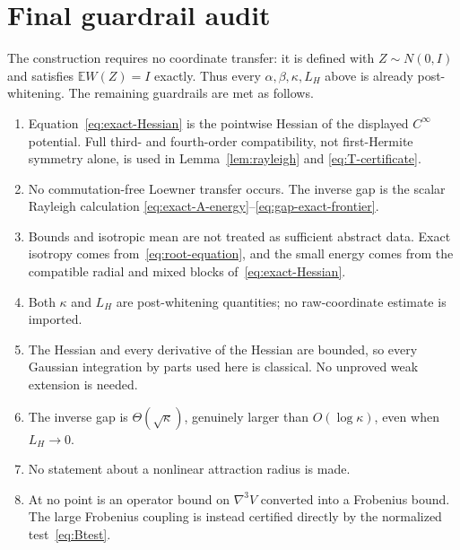 \documentclass[11pt]{article}
\numberwithin{equation}{section}
\newcommand{\E}{\mathbb E}
\begin{document}
\section{Final guardrail audit}

The construction requires no coordinate transfer: it is defined with
$Z\sim N(0,I)$ and satisfies $\E W(Z)=I$ exactly.  Thus every
$\alpha,\beta,\kappa,L_H$ above is already post-whitening.  The remaining
guardrails are met as follows.
\begin{enumerate}[leftmargin=2em,label=\arabic*.,itemsep=.2em,topsep=.3em]
 \item Equation~\eqref{eq:exact-Hessian} is the pointwise Hessian of the
 displayed $C^\infty$ potential.  Full third- and fourth-order compatibility,
 not first-Hermite symmetry alone, is used in Lemma~\ref{lem:rayleigh} and
 \eqref{eq:T-certificate}.
 \item No commutation-free Loewner transfer occurs.  The inverse gap is the
 scalar Rayleigh calculation
 \eqref{eq:exact-A-energy}--\eqref{eq:gap-exact-frontier}.
 \item Bounds and isotropic mean are not treated as sufficient abstract data.
 Exact isotropy comes from~\eqref{eq:root-equation}, and the small energy comes
 from the compatible radial and mixed blocks of~\eqref{eq:exact-Hessian}.
 \item Both $\kappa$ and $L_H$ are post-whitening quantities; no raw-coordinate
 estimate is imported.
 \item The Hessian and every derivative of the Hessian are bounded, so every
 Gaussian integration by parts used here is classical.  No unproved weak
 extension is needed.
 \item The inverse gap is $\Theta(\sqrt\kappa)$, genuinely larger than
 $O(\log\kappa)$, even when $L_H\to0$.
 \item No statement about a nonlinear attraction radius is made.
 \item At no point is an operator bound on $\nabla^3V$ converted into a
 Frobenius bound.  The large Frobenius coupling is instead certified directly
 by the normalized test~\eqref{eq:Btest}.
\end{enumerate}
\end{document}
